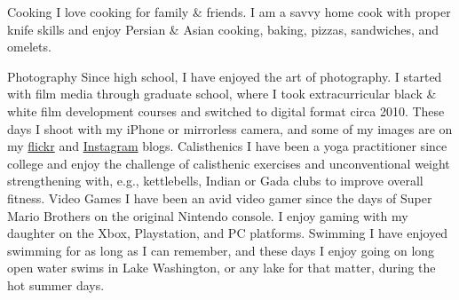 



\begin{cvskills}
  \cvskill
    {Cooking} %
    {I love cooking for family \& friends. I am a savvy home cook with proper knife skills and enjoy Persian \& Asian cooking, baking, pizzas, sandwiches, and omelets.} %

  \cvskill
    {Photography} %
    {Since high school, I have enjoyed the art of photography. I started with film media through graduate school, where I took extracurricular black \& white film development courses and switched to digital format circa 2010. These days I shoot with my iPhone or mirrorless camera, and some of my images are on my \href{https://flickr.com/photos/cambysese/}{flickr} and \href{https://instagram.com/ktavabi}{Instagram} blogs.} %
  \cvskill
    {Calisthenics} %
    {I have been a yoga practitioner since college and enjoy the challenge of calisthenic exercises and unconventional weight strengthening with, e.g., kettlebells, Indian or Gada clubs to improve overall fitness.} %
  \cvskill
    {Video Games} %
    {I have been an avid video gamer since the days of Super Mario Brothers on the original Nintendo console. I enjoy gaming with my daughter on the Xbox, Playstation, and PC platforms.} %
  \cvskill
    {Swimming} %
    {I have enjoyed swimming for as long as I can remember, and these days I enjoy going on long open water swims in Lake Washington, or any lake for that matter, during the hot summer days.} %

\end{cvskills}